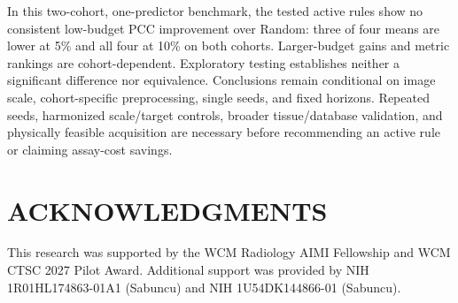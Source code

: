 \documentclass[]{spie}
\begin{document}
In this two-cohort, one-predictor benchmark, the tested active rules show no consistent low-budget PCC improvement over Random: three of four means are lower at 5\% and all four at 10\% on both cohorts. Larger-budget gains and metric rankings are cohort-dependent. Exploratory testing establishes neither a significant difference nor equivalence. Conclusions remain conditional on image scale, cohort-specific preprocessing, single seeds, and fixed horizons. Repeated seeds, harmonized scale/target controls, broader tissue/database validation, and physically feasible acquisition are necessary before recommending an active rule or claiming assay-cost savings.

\section*{ACKNOWLEDGMENTS}
This research was supported by the WCM Radiology AIMI Fellowship and WCM CTSC 2027 Pilot Award. Additional support was provided by NIH 1R01HL174863-01A1 (Sabuncu) and NIH 1U54DK144866-01 (Sabuncu).



\end{document}
